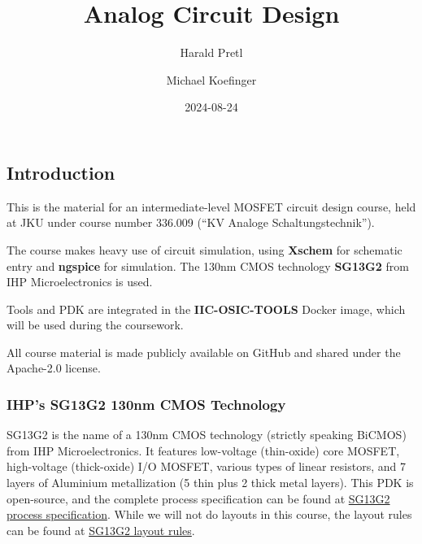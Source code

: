 \documentclass[
  a4paper,
  DIV=11,
  numbers=noendperiod]{scrartcl}
\title{Analog Circuit Design}
\author{Harald Pretl \and Michael Koefinger}
\date{2024-08-24}
\renewcommand*\contentsname{Table of contents}
\newcommand\contentsname{Table of contents}
\begin{document}
\maketitle

\renewcommand*\contentsname{Table of contents}
{
\hypersetup{linkcolor=}
\setcounter{tocdepth}{3}
\tableofcontents
}

\subsection{Introduction}\label{sec-intro}

This is the material for an intermediate-level MOSFET circuit design
course, held at JKU under course number 336.009 (``KV Analoge
Schaltungstechnik'').

The course makes heavy use of circuit simulation, using \textbf{Xschem}
for schematic entry and \textbf{ngspice} for simulation. The 130nm CMOS
technology \textbf{SG13G2} from IHP Microelectronics is used.

Tools and PDK are integrated in the \textbf{IIC-OSIC-TOOLS} Docker
image, which will be used during the coursework.

\begin{tcolorbox}[enhanced jigsaw, opacitybacktitle=0.6, colback=white, left=2mm, toptitle=1mm, opacityback=0, rightrule=.15mm, bottomrule=.15mm, breakable, arc=.35mm, toprule=.15mm, colframe=quarto-callout-note-color-frame, colbacktitle=quarto-callout-note-color!10!white, bottomtitle=1mm, titlerule=0mm, coltitle=black, leftrule=.75mm, title=\textcolor{quarto-callout-note-color}{\faInfo}\hspace{0.5em}{Note}]

All course material is made publicly available on GitHub and shared
under the Apache-2.0 license.

\end{tcolorbox}

\subsubsection{IHP's SG13G2 130nm CMOS
Technology}\label{ihps-sg13g2-130nm-cmos-technology}

SG13G2 is the name of a 130nm CMOS technology (strictly speaking BiCMOS)
from IHP Microelectronics. It features low-voltage (thin-oxide) core
MOSFET, high-voltage (thick-oxide) I/O MOSFET, various types of linear
resistors, and 7 layers of Aluminium metallization (5 thin plus 2 thick
metal layers). This PDK is open-source, and the complete process
specification can be found at
\href{https://github.com/IHP-GmbH/IHP-Open-PDK/blob/main/ihp-sg13g2/libs.doc/doc/SG13G2_os_process_spec.pdf}{SG13G2
process specification}. While we will not do layouts in this course, the
layout rules can be found at
\href{https://github.com/IHP-GmbH/IHP-Open-PDK/blob/main/ihp-sg13g2/libs.doc/doc/SG13G2_os_layout_rules.pdf}{SG13G2
layout rules}.
\end{document}
